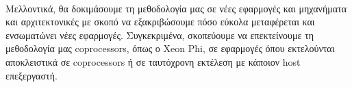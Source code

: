 \paragraph{}
Μελλοντικά, θα δοκιμάσουμε τη μεθοδολογία μας σε νέες εφαρμογές και μηχανήματα και αρχιτεκτονικές με σκοπό να εξακριβώσουμε πόσο εύκολα μεταφέρεται και ενσωματώνει νέες εφαρμογές. Συγκεκριμένα, σκοπεύουμε να επεκτείνουμε τη μεθοδολογία μας coprocessors, όπως ο Xeon Phi, σε εφαρμογές όπου εκτελούνται αποκλειστικά σε coprocessors ή σε ταυτόχρονη εκτέλεση με κάποιον host επεξεργαστή. 

